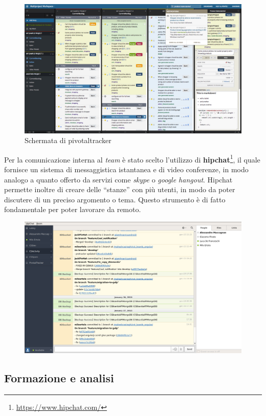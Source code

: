 \begin{figure}[htpd]
\centering
\includegraphics[width=\textwidth]{../immagini/pivotal-tracker}
\caption{Schermata di pivotaltracker}  
\end{figure}

Per la comunicazione interna al \textit{team} è stato scelto l'utilizzo di \textbf{hipchat}\footnote{\url{https://www.hipchat.com/}}, il quale fornisce un sistema di messaggistica istantanea e di video conferenze, in modo analogo a quanto offerto da servizi come \textit{skype} o \textit{google hangout}. Hipchat permette inoltre di creare delle ``stanze'' con più utenti, in modo da poter discutere di un preciso argomento o tema. Questo strumento è di fatto fondamentale per poter lavorare da remoto.

\begin{figure}[htpd]
\centering
\includegraphics[width=\textwidth]{../immagini/hipchat}
\caption{}  
\end{figure}

\subsection*{Formazione e analisi}


